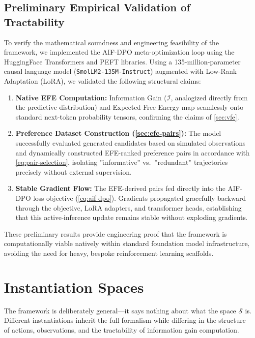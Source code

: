 \documentclass[11pt]{article}
\begin{document}
\subsection{Preliminary Empirical Validation of Tractability}
\label{sec:tractability-validation}

To verify the mathematical soundness and engineering feasibility of the framework, we implemented the AIF-DPO meta-optimization loop using the HuggingFace Transformers and PEFT \citep{peft} libraries. Using a 135-million-parameter causal language model (\texttt{SmolLM2-135M-Instruct}) augmented with Low-Rank Adaptation (LoRA), we validated the following structural claims:

\begin{enumerate}
    \item \textbf{Native EFE Computation:} Information Gain ($\mathcal{I}$, analogized directly from the predictive distribution) and Expected Free Energy map seamlessly onto standard next-token probability tensors, confirming the claims of \cref{sec:vfe}.
    \item \textbf{Preference Dataset Construction (\cref{sec:efe-pairs}):} The model successfully evaluated generated candidates based on simulated observations and dynamically constructed EFE-ranked preference pairs in accordance with \cref{eq:pair-selection}, isolating ''informative'' vs.~''redundant'' trajectories precisely without external supervision.
    \item \textbf{Stable Gradient Flow:} The EFE-derived pairs fed directly into the AIF-DPO loss objective (\cref{eq:aif-dpo}). Gradients propagated gracefully backward through the objective, LoRA adapters, and transformer heads, establishing that this active-inference update remains stable without exploding gradients.
\end{enumerate}

These preliminary results provide engineering proof that the framework is computationally viable natively within standard foundation model infrastructure, avoiding the need for heavy, bespoke reinforcement learning scaffolds.


\section{Instantiation Spaces}
\label{sec:instantiation}

The framework is deliberately general---it says nothing about what the space $\mathcal{S}$ is. Different instantiations inherit the full formalism while differing in the structure of actions, observations, and the tractability of information gain computation.
\end{document}
